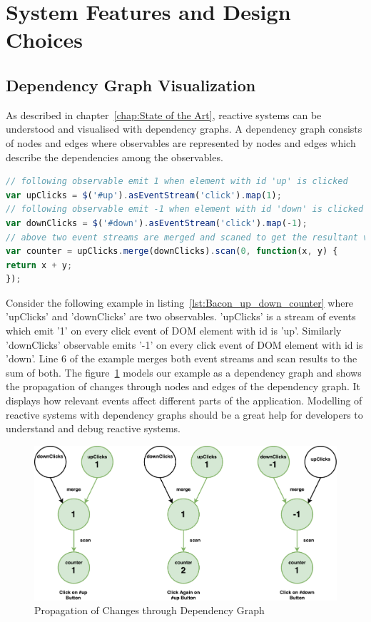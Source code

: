 \section{System Features and Design Choices}
\subsection{Dependency Graph Visualization}
As described in chapter~\ref{chap:State of the Art}, reactive systems can be understood and visualised with dependency graphs. A dependency graph consists of nodes and edges where observables are represented by nodes and edges which describe the dependencies among the observables. 

\begin{lstlisting}[language=JavaScript, caption=Bacon.js Example of Up - Down Counter  , label={lst:Bacon_up_down_counter}]
// following observable emit 1 when element with id 'up' is clicked
var upClicks = $('#up').asEventStream('click').map(1);
// following observable emit -1 when element with id 'down' is clicked
var downClicks = $('#down').asEventStream('click').map(-1);
// above two event streams are merged and scaned to get the resultant value
var counter = upClicks.merge(downClicks).scan(0, function(x, y) {
return x + y;
});
\end{lstlisting}

Consider the following example in listing~\ref{lst:Bacon_up_down_counter} where 'upClicks' and 'downClicks' are two observables. 'upClicks' is a stream of events which emit '1' on every click event of DOM element with id is 'up'. Similarly 'downClicks' observable emits '-1' on every click event of DOM element with id is 'down'. Line 6 of the example merges both event streams and scan results to the sum of both. The figure~\ref{fig:sys-design_dependency-graph} models our example as a dependency graph and shows the propagation of changes through nodes and edges of the dependency graph. It displays how relevant events affect different parts of the application. Modelling of reactive systems with dependency graphs should be a great help for developers to understand and debug reactive systems.

\begin{figure}[!h]
	\centering
	\includegraphics[scale=0.5,trim=0 0 0 0]{gfx/sys-design_dependency-graph.pdf}
	\caption{Propagation of Changes through Dependency Graph}
	\label{fig:sys-design_dependency-graph}
\end{figure}


